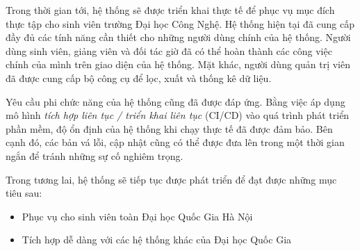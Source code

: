 \documentclass[./../main.tex]{subfiles}
\begin{document}
Trong thời gian tới, hệ thống sẽ được triển khai thực tế để phục vụ mục
đích thực tập cho sinh viên trường Đại học Công Nghệ. Hệ thống hiện tại
đã cung cấp đầy đủ các tính năng cần thiết cho những người dùng chính
của hệ thống. Người dùng sinh viên, giảng viên và đối tác giờ đã có thể
hoàn thành các công việc chính của mình trên giao diện của hệ thống. Mặt
khác, người dùng quản trị viên đã được cung cấp bộ công cụ để lọc, xuất
và thống kê dữ liệu.

Yêu cầu phi chức năng của hệ thống cũng đã được đáp ứng. Bằng việc áp
dụng mô hình \emph{tích hợp liên tục / triển khai liên tục} (CI/CD) vào
quá trình phát triển phần mềm, độ ổn định của hệ thống khi chạy thực tế
đã được đảm bảo. Bên cạnh đó, các bản vá lỗi, cập nhật cũng có thể được
đưa lên trong một thời gian ngắn để tránh những sự cố nghiêm trọng.

Trong tương lai, hệ thống sẽ tiếp tục được phát triển để đạt được những mục tiêu sau:
\begin{itemize}
    \item Phục vụ cho sinh viên toàn Đại học Quốc Gia Hà Nội
    \item Tích hợp dễ dàng với các hệ thống khác của Đại học Quốc Gia
\end{itemize}
\end{document}
